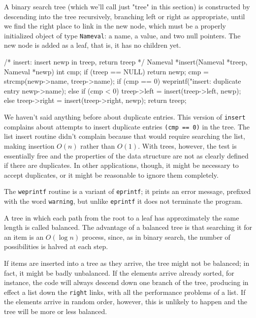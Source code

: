 A binary search tree (which we'll call just "tree" in this section) is
constructed by descending into the tree recursively, branching left or
right as appropriate, until we find the right place to link in the new
node, which must be a properly initialized object of type \verb'Nameval': a
name, a value, and two null pointers. The new node is added as a leaf, that
is, it has no children yet.
\begin{wellcode}
    /* insert: insert newp in treep, return treep */
    Nameval *insert(Nameval *treep, Nameval *newp)
    {
        int cmp;
        if (treep == NULL)
            return newp;
        cmp = strcmp(newp->name, treep->name);
        if (cmp == 0)
            weprintf("insert: duplicate entry %
                    newp->name);
        else if (cmp < 0)
            treep->left = insert(treep->left, newp);
        else
            treep->right = insert(treep->right, newp);
        return treep;
    }
\end{wellcode}
We haven't said anything before about duplicate entries. This version of
\verb'insert' complains about attempts to insert duplicate entries
\verb'(cmp == 0)' in the tree. The list insert routine didn't complain
because that would require searching the list, making insertion $O(n)$
rather than $O(1)$. With trees, however, the test is essentially free and
the properties of the data structure are not as clearly defined if there
are duplicates. In other applications, though, it might be necessary to
accept duplicates, or it might be reasonable to ignore them completely.

The \verb'weprintf' routine is a variant of \verb'eprintf'; it prints an
error message, prefixed with the word \verb'warning', but unlike
\verb'eprintf' it does not terminate the program.

A tree in which each path from the root to a leaf has approximately the
same length is called balanced. The advantage of a balanced tree is that
searching it for an item is an $O(\log n)$ process, since, as in binary
search, the number of possibilities is halved at each step.

If items are inserted into a tree as they arrive, the tree might not be
balanced; in fact, it might be badly unbalanced. If the elements arrive
already sorted, for instance, the code will always descend down one branch
of the tree, producing in effect a list down the \verb'right' links, with
all the performance problems of a list. If the elements arrive in random
order, however, this is unlikely to happen and the tree will be more or
less balanced.

